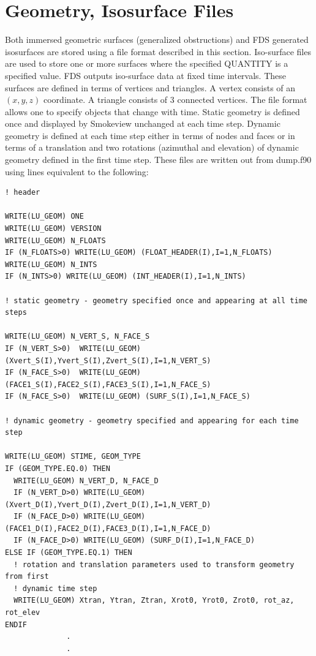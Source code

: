 \documentclass[11pt]{book}
\begin{document}
\section{Geometry, Isosurface Files}
\label{out:GEOMETRY}

Both immersed geometric surfaces (generalized obstructions) and FDS generated isosurfaces are stored using a file format described in this section. Iso-surface files are used to store one or more surfaces where the specified {\ct QUANTITY} is a specified value. FDS outputs iso-surface data at fixed time intervals.  These surfaces are defined in terms of vertices and triangles.  A vertex consists of an $(x,y,z)$ coordinate. A triangle consists of 3 connected vertices.  The file format allows one to specify objects that change with time. Static geometry is defined once and displayed by Smokeview unchanged at each time step. Dynamic geometry is defined at each time step either in terms of nodes and faces or in terms of a translation and two rotations (azimuthal and elevation) of dynamic geometry defined in the first time step. These files are written out from {\ct dump.f90} using lines equivalent to the following:
\begin{lstlisting}
! header

WRITE(LU_GEOM) ONE
WRITE(LU_GEOM) VERSION
WRITE(LU_GEOM) N_FLOATS
IF (N_FLOATS>0) WRITE(LU_GEOM) (FLOAT_HEADER(I),I=1,N_FLOATS)
WRITE(LU_GEOM) N_INTS
IF (N_INTS>0) WRITE(LU_GEOM) (INT_HEADER(I),I=1,N_INTS)

! static geometry - geometry specified once and appearing at all time steps

WRITE(LU_GEOM) N_VERT_S, N_FACE_S
IF (N_VERT_S>0)  WRITE(LU_GEOM) (Xvert_S(I),Yvert_S(I),Zvert_S(I),I=1,N_VERT_S)
IF (N_FACE_S>0)  WRITE(LU_GEOM) (FACE1_S(I),FACE2_S(I),FACE3_S(I),I=1,N_FACE_S)
IF (N_FACE_S>0)  WRITE(LU_GEOM) (SURF_S(I),I=1,N_FACE_S)

! dynamic geometry - geometry specified and appearing for each time step

WRITE(LU_GEOM) STIME, GEOM_TYPE
IF (GEOM_TYPE.EQ.0) THEN
  WRITE(LU_GEOM) N_VERT_D, N_FACE_D
  IF (N_VERT_D>0) WRITE(LU_GEOM) (Xvert_D(I),Yvert_D(I),Zvert_D(I),I=1,N_VERT_D)
  IF (N_FACE_D>0) WRITE(LU_GEOM) (FACE1_D(I),FACE2_D(I),FACE3_D(I),I=1,N_FACE_D)
  IF (N_FACE_D>0) WRITE(LU_GEOM) (SURF_D(I),I=1,N_FACE_D)
ELSE IF (GEOM_TYPE.EQ.1) THEN
  ! rotation and translation parameters used to transform geometry from first
  ! dynamic time step
  WRITE(LU_GEOM) Xtran, Ytran, Ztran, Xrot0, Yrot0, Zrot0, rot_az, rot_elev
ENDIF
              .
              .
\end{lstlisting}
\end{document}
